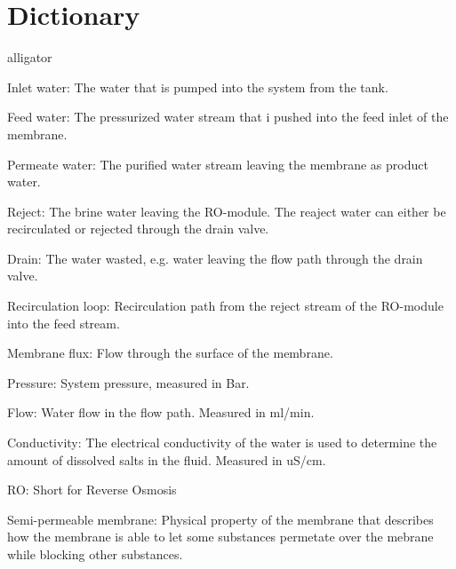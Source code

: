 

\section*{Dictionary}


\begin{labeling}{alligator}
\renewcommand\labelitemi{ }
\item [Inlet water:] The water that is pumped into the system from the tank.
\item [Feed water:] The pressurized water stream that i pushed into the feed inlet of the membrane.
\item [Permeate water:]  The purified water stream leaving the membrane as product water.
\item [Reject:] The brine water leaving the RO-module. The reaject water can either be recirculated or rejected through the drain valve.
\item [Drain:] The water wasted, e.g. water leaving the flow path through the drain valve.
\item [Recirculation loop:] Recirculation path from the reject stream of the RO-module into the feed stream.
\item [Membrane flux:] Flow through the surface of the membrane.
\item [Pressure:]  System pressure, measured in Bar.
\item [Flow:] Water flow in the flow path. Measured in ml/min.
\item [Conductivity:] The electrical conductivity of the water is used to determine the amount of dissolved salts in the fluid. Measured in uS/cm.
\item [RO:] Short for Reverse Osmosis
\item [Semi-permeable membrane:] Physical property of the membrane that describes how the membrane is able to let some substances permetate over the mebrane while blocking other substances.


\end{labeling}



